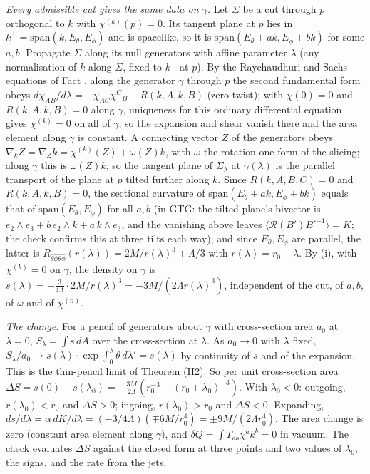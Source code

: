\emph{Every admissible cut gives the same data on $\gamma$.} Let $\Sigma$ be a cut through $p$ orthogonal to $k$ with $\chi^{(k)}(p) = 0$. Its tangent plane at $p$ lies in $k^{\perp} = \mathrm{span}(k, E_{\theta}, E_{\phi})$ and is spacelike, so it is $\mathrm{span}(E_{\theta} + a k, E_{\phi} + b k)$ for some $a, b$. Propagate $\Sigma$ along its null generators with affine parameter $\lambda$ (any normalisation of $k$ along $\Sigma$, fixed to $k_{\pm}$ at $p$). By the Raychaudhuri and Sachs equations of Fact , along the generator $\gamma$ through $p$ the second fundamental form obeys $d\chi_{AB}/d\lambda = -\chi_{AC}\chi^{C}{}_{B} - R(k, A, k, B)$ (zero twist); with $\chi(0) = 0$ and $R(k, A, k, B) = 0$ along $\gamma$, uniqueness for this ordinary differential equation gives $\chi^{(k)} = 0$ on all of $\gamma$, so the expansion and shear vanish there and the area element along $\gamma$ is constant. A connecting vector $Z$ of the generators obeys $\nabla_{k}Z = \nabla_{Z}k = \chi^{(k)}(Z) + \omega(Z)k$, with $\omega$ the rotation one-form of the slicing; along $\gamma$ this is $\omega(Z)k$, so the tangent plane of $\Sigma_{\lambda}$ at $\gamma(\lambda)$ is the parallel transport of the plane at $p$ tilted further along $k$. Since $R(k, A, B, C) = 0$ and $R(k, A, k, B) = 0$, the sectional curvature of $\mathrm{span}(E_{\theta} + a k, E_{\phi} + b k)$ equals that of $\mathrm{span}(E_{\theta}, E_{\phi})$ for all $a, b$ (in GTG: the tilted plane's bivector is $e_{2}\wedge e_{3} + b\,e_{2}\wedge k + a\,k\wedge e_{3}$, and the vanishing above leaves $\langle\mathcal{R}(B')B'^{-1}\rangle = K$; the check confirms this at three tilts each way); and since $E_{\theta}, E_{\phi}$ are parallel, the latter is $R_{\hat\theta\hat\phi\hat\theta\hat\phi}(r(\lambda)) = 2M/r(\lambda)^{3} + \Lambda/3$ with $r(\lambda) = r_{0} \pm \lambda$. By (i), with $\chi^{(k)} = 0$ on $\gamma$, the density on $\gamma$ is $s(\lambda) = -\tfrac{3}{4\Lambda}\cdot 2M/r(\lambda)^{3} = -3M/(2\Lambda r(\lambda)^{3})$, independent of the cut, of $a, b$, of $\omega$ and of $\chi^{(n)}$.

\emph{The change.} For a pencil of generators about $\gamma$ with cross-section area $a_{0}$ at $\lambda = 0$, $S_{\lambda} = \int s\,dA$ over the cross-section at $\lambda$. As $a_{0} \to 0$ with $\lambda$ fixed, $S_{\lambda}/a_{0} \to s(\lambda)\cdot\exp\int_{0}^{\lambda}\theta\,d\lambda' = s(\lambda)$ by continuity of $s$ and of the expansion. This is the thin-pencil limit of Theorem (H2). So per unit cross-section area $\Delta S = s(0) - s(\lambda_{0}) = -\tfrac{3M}{2\Lambda}(r_{0}^{-3} - (r_{0} \pm \lambda_{0})^{-3})$. With $\lambda_{0} < 0$: outgoing, $r(\lambda_{0}) < r_{0}$ and $\Delta S > 0$; ingoing, $r(\lambda_{0}) > r_{0}$ and $\Delta S < 0$. Expanding, $ds/d\lambda = \alpha\,dK/d\lambda = (-3/4\Lambda)(\mp 6M/r_{0}^{4}) = \pm 9M/(2\Lambda r_{0}^{4})$. The area change is zero (constant area element along $\gamma$), and $\delta Q = \int T_{ab}\chi^{a}k^{b} = 0$ in vacuum. The check evaluates $\Delta S$ against the closed form at three points and two values of $\lambda_{0}$, the signs, and the rate from the jets.

